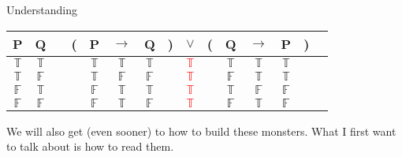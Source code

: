 \documentclass[
  ignorenonframetext,
]{beamer}
\renewcommand{\,}{\text{, }}
\def\True{\mathbb{T}}
\def\False{\mathbb{F}}
\begin{document}
\begin{frame}{Understanding}
\protect\hypertarget{understanding}{}

\begin{center}
\begin{tabular}{@{ }c@{ }@{ }c | c@{ }@{}c@{}@{ }c@{ }@{ }c@{ }@{ }c@{ }@{}c@{}@{ }c@{ }@{}c@{}@{ }c@{ }@{ }c@{ }@{ }c@{ }@{}c@{}@{ }c}
P & Q &  & ( & P & $\rightarrow$ & Q & ) & $\lor$ & ( & Q & $\rightarrow$ & P & ) & \\
\hline 
$\True$ & $\True$ &  &  & $\True$ & $\True$ & $\True$ &  & \textcolor{red}{$\True$} &  & $\True$ & $\True$ & $\True$ &  & \\
$\True$ & $\False$ &  &  & $\True$ & $\False$ & $\False$ &  & \textcolor{red}{$\True$} &  & $\False$ & $\True$ & $\True$ &  & \\
$\False$ & $\True$ &  &  & $\False$ & $\True$ & $\True$ &  & \textcolor{red}{$\True$} &  & $\True$ & $\False$ & $\False$ &  & \\
$\False$ & $\False$ &  &  & $\False$ & $\True$ & $\False$ &  & \textcolor{red}{$\True$} &  & $\False$ & $\True$ & $\False$ &  & \\
\end{tabular}
\bigskip
\end{center}

We will also get (even sooner) to how to build these monsters. What I
first want to talk about is how to read them.

\end{frame}
\end{document}

